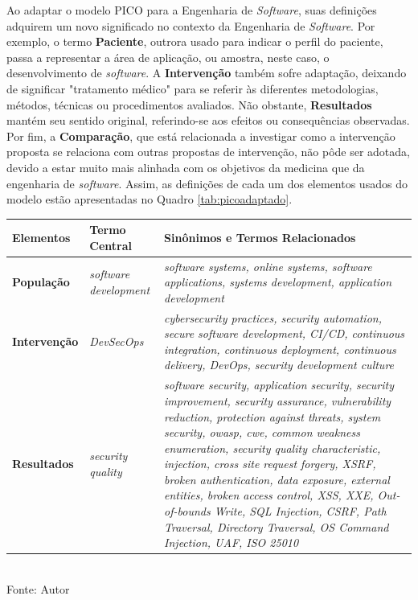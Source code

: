Ao adaptar o modelo PICO para a Engenharia de \textit{Software}, suas definições adquirem um novo significado no contexto da Engenharia de \textit{Software}. Por exemplo, o termo \textbf{Paciente}, outrora usado para indicar o perfil do paciente, passa a representar a área de aplicação, ou amostra, neste caso, o desenvolvimento de \textit{software}. A \textbf{Intervenção} também sofre adaptação, deixando de significar "tratamento médico" para se referir às diferentes metodologias, métodos, técnicas ou procedimentos avaliados. Não obstante, \textbf{Resultados} mantém seu sentido original, referindo-se aos efeitos ou consequências observadas. Por fim, a \textbf{Comparação}, que está relacionada a investigar como a intervenção proposta se relaciona com outras propostas de intervenção, não pôde ser adotada, devido a estar muito mais alinhada com os objetivos da medicina que da engenharia de \textit{software}. Assim, as definições de cada um dos elementos usados do modelo estão apresentadas no Quadro \ref{tab:picoadaptado}.

\begin{quadro}[H]
    \centering
    \caption{PICO Adaptado}
    \begin{tabular}{|p{4cm}|p{3cm}|p{5cm}|}
        \hline
        \textbf{Elementos} & \textbf{Termo Central} & \textbf{Sinônimos e Termos Relacionados} \\
        \hline
        \textbf{População} & \textit{software development} & \textit{software systems, online systems, software applications, systems development, application development} \\
        \hline
        \textbf{Intervenção} & \textit{DevSecOps} & \textit{cybersecurity practices, security automation, secure software development, CI/CD, continuous integration, continuous deployment, continuous delivery, DevOps, security development culture} \\
        \hline
        \textbf{Resultados} & \textit{security quality} & \textit{software security, application security, security improvement, security assurance, vulnerability reduction, protection against threats, system security, owasp, cwe, common weakness enumeration, security quality characteristic, injection, cross site request forgery, XSRF, broken authentication, data exposure, external entities, broken access control, XSS, XXE, Out-of-bounds Write, SQL Injection, CSRF, Path Traversal, Directory Traversal, OS Command Injection, UAF, ISO 25010} \\
        \hline
    \end{tabular} \\[0.5em]
    Fonte: Autor
    \label{tab:picoadaptado}
\end{quadro}


